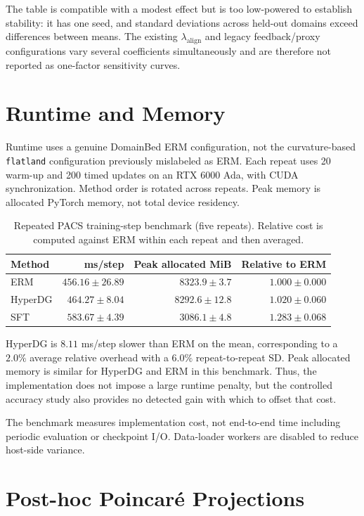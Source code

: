 \documentclass[10pt]{article}
\begin{document}
The table is compatible with a modest effect but is too low-powered to
establish stability: it has one seed, and standard deviations across held-out
domains exceed differences between means. The existing $\lambda_{\mathrm{align}}$
and legacy feedback/proxy configurations vary several coefficients
simultaneously and are therefore not reported as one-factor sensitivity curves.

\section{Runtime and Memory}
\label{sec:runtime}

Runtime uses a genuine DomainBed ERM configuration, not the curvature-based
\texttt{flatland} configuration previously mislabeled as ERM. Each repeat uses
20 warm-up and 200 timed updates on an RTX 6000 Ada, with CUDA synchronization.
Method order is rotated across repeats. Peak memory is allocated PyTorch memory,
not total device residency.

\begin{table}[H]
\centering
\caption{Repeated PACS training-step benchmark (five repeats). Relative cost
is computed against ERM within each repeat and then averaged.}
\label{tab:runtime}
\begin{tabular}{lrrr}
\toprule
Method & ms/step & Peak allocated MiB & Relative to ERM \\
\midrule
ERM     & $456.16\pm26.89$ & $8323.9\pm3.7$  & $1.000\pm0.000$ \\
HyperDG & $464.27\pm8.04$  & $8292.6\pm12.8$ & $1.020\pm0.060$ \\
SFT     & $583.67\pm4.39$  & $3086.1\pm4.8$  & $1.283\pm0.068$ \\
\bottomrule
\end{tabular}
\end{table}

HyperDG is $8.11$ ms/step slower than ERM on the mean, corresponding to a
$2.0\%$ average relative overhead with a $6.0\%$ repeat-to-repeat SD. Peak
allocated memory is similar for HyperDG and ERM in this benchmark. Thus, the
implementation does not impose a large runtime penalty, but the controlled
accuracy study also provides no detected gain with which to offset that cost.

The benchmark measures implementation cost, not end-to-end time including
periodic evaluation or checkpoint I/O. Data-loader workers are disabled to
reduce host-side variance.

\section{Post-hoc Poincar\'e Projections}
\label{sec:poincare}
\end{document}
